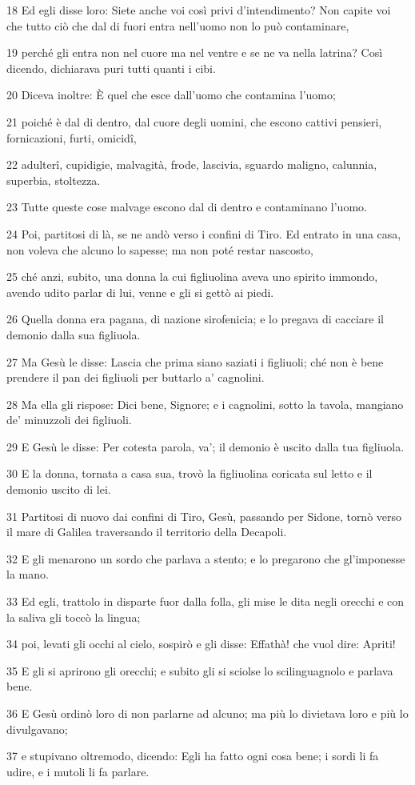 \par 18 Ed egli disse loro: Siete anche voi così privi d'intendimento? Non capite voi che tutto ciò che dal di fuori entra nell'uomo non lo può contaminare,
\par 19 perché gli entra non nel cuore ma nel ventre e se ne va nella latrina? Così dicendo, dichiarava puri tutti quanti i cibi.
\par 20 Diceva inoltre: È quel che esce dall'uomo che contamina l'uomo;
\par 21 poiché è dal di dentro, dal cuore degli uomini, che escono cattivi pensieri, fornicazioni, furti, omicidî,
\par 22 adulterî, cupidigie, malvagità, frode, lascivia, sguardo maligno, calunnia, superbia, stoltezza.
\par 23 Tutte queste cose malvage escono dal di dentro e contaminano l'uomo.
\par 24 Poi, partitosi di là, se ne andò verso i confini di Tiro. Ed entrato in una casa, non voleva che alcuno lo sapesse; ma non poté restar nascosto,
\par 25 ché anzi, subito, una donna la cui figliuolina aveva uno spirito immondo, avendo udito parlar di lui, venne e gli si gettò ai piedi.
\par 26 Quella donna era pagana, di nazione sirofenicia; e lo pregava di cacciare il demonio dalla sua figliuola.
\par 27 Ma Gesù le disse: Lascia che prima siano saziati i figliuoli; ché non è bene prendere il pan dei figliuoli per buttarlo a' cagnolini.
\par 28 Ma ella gli rispose: Dici bene, Signore; e i cagnolini, sotto la tavola, mangiano de' minuzzoli dei figliuoli.
\par 29 E Gesù le disse: Per cotesta parola, va'; il demonio è uscito dalla tua figliuola.
\par 30 E la donna, tornata a casa sua, trovò la figliuolina coricata sul letto e il demonio uscito di lei.
\par 31 Partitosi di nuovo dai confini di Tiro, Gesù, passando per Sidone, tornò verso il mare di Galilea traversando il territorio della Decapoli.
\par 32 E gli menarono un sordo che parlava a stento; e lo pregarono che gl'imponesse la mano.
\par 33 Ed egli, trattolo in disparte fuor dalla folla, gli mise le dita negli orecchi e con la saliva gli toccò la lingua;
\par 34 poi, levati gli occhi al cielo, sospirò e gli disse: Effathà! che vuol dire: Apriti!
\par 35 E gli si aprirono gli orecchi; e subito gli si sciolse lo scilinguagnolo e parlava bene.
\par 36 E Gesù ordinò loro di non parlarne ad alcuno; ma più lo divietava loro e più lo divulgavano;
\par 37 e stupivano oltremodo, dicendo: Egli ha fatto ogni cosa bene; i sordi li fa udire, e i mutoli li fa parlare.


